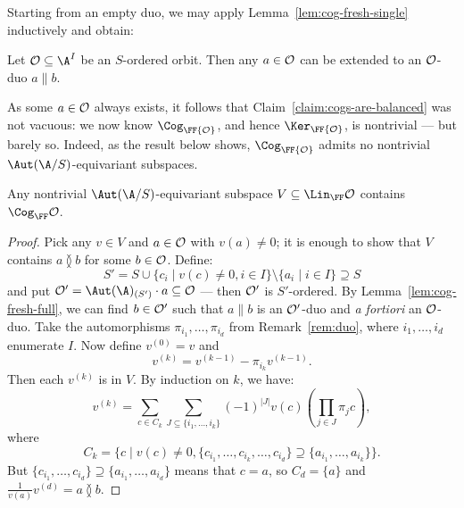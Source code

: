 Starting from an empty duo, we may apply Lemma~\ref{lem:cog-fresh-single} inductively and obtain:
\begin{lemma}\label{lem:cog-fresh-full}
    Let $\cal O \subseteq \A^I$ be an $S$-ordered orbit.
    Then any $a \in \cal O$ can be extended to an ${\cal O}$-duo $a\parallel b$.
\end{lemma}

As some $a \in \cal O$ always exists, it follows that Claim~\ref{claim:cogs-are-balanced} was not vacuous:
we now know $\Cog_\FF{\cal O}$, and hence $\Ker_\FF{\cal O}$, is nontrivial --- but barely so.
Indeed, as the result below shows, $\Cog_\FF{\cal O}$ admits no nontrivial $\Aut(\A/S)$-equivariant subspaces.
\begin{theorem} \label{thm:cogs-arise-everywhere}
    Any nontrivial $\Aut(\A/S)$-equivariant subspace $V\subseteq \Lin_\FF \cal O$ contains $\Cog_\FF \cal O$.
\end{theorem}
\begin{proof}
    Pick any $v \in V$ and $a \in \cal O$ with $v(a)\neq 0$;
    it is enough to show that $V$ contains $a \between b$ for some $b\in \cal O$.
    Define:
    \[
        S' = S \cup \{c_i \mid v(c) \neq 0, i \in I\} \setminus \{a_i \mid i \in I\} \supseteq S
    \]
    and put $\cal O' = \Aut(\A)_{(S')} \cdot a \subseteq \cal O$ --- then $\cal O'$ is $S'$-ordered.
    By Lemma~\ref{lem:cog-fresh-full}, we can find $b \in \cal O'$ such that $a \parallel b$ is an $\cal O'$-duo and \emph{a fortiori} an $\cal O$-duo.
    Take the automorphisms $\pi_{i_1}, \dots, \pi_{i_d}$ from Remark~\ref{rem:duo}, where $i_1, \dots, i_d$ enumerate $I$.
    Now define $v^{(0)} = v$ and \[
        v^{(k)} = v^{(k-1)} - \pi_{i_k} v^{(k-1)}.
    \]
    Then each $v^{(k)}$ is in $V$.
   By induction on $k$, we have:
    \[
        v^{(k)} = \sum_{c \in C_k} \sum_{J \subseteq \{i_1, \dots, i_k\}} (-1)^{|J|} v(c) \left(\prod_{j \in J} \pi_j c\right),
    \]
    where
    \[C_k = \{ c \mid v(c) \neq 0, \{c_{i_1}, \dots, c_{i_k}, \dots, c_{i_d}\} \supseteq \{a_{i_1}, \dots, a_{i_k}\} \}.
    \]
    But $\{c_{i_1}, \dots, c_{i_d}\} \supseteq \{a_{i_1}, \dots, a_{i_d}\}$ means that $c = a$, so $C_d=\{a\}$ and $\frac{1}{v(a)}v^{(d)}=a\between b$.
\end{proof}

